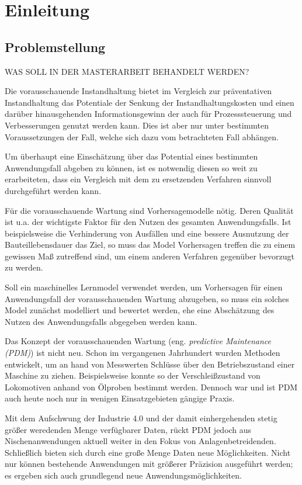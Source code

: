 \chapter{Einleitung}
\label{ch:einleitung}

\section{Problemstellung}
\label{sec:motivation}
WAS SOLL IN DER MASTERARBEIT BEHANDELT WERDEN?

Die vorausschauende Instandhaltung bietet im Vergleich zur präventativen Instandhaltung das Potentiale der Senkung der Instandhaltungskosten und einen darüber hinausgehenden Informationsgewinn der auch für Prozesssteuerung und Verbesserungen genutzt werden kann. Dies ist aber nur unter bestimmten Voraussetzungen der Fall, welche sich dazu vom betrachteten Fall abhängen.

Um überhaupt eine Einschätzung über das Potential eines bestimmten Anwendungsfall abgeben zu können, ist es notwendig diesen so weit zu erarbeiteten, dass ein Vergleich mit dem zu ersetzenden Verfahren sinnvoll durchgeführt werden kann.

Für die vorausschauende Wartung sind Vorhersagemodelle nötig. Deren Qualität ist u.a. der wichtigste Faktor für den Nutzen des gesamten Anwendungsfalls. Ist beispielsweise die Verhinderung von Ausfällen und eine bessere Ausnutzung der Bauteillebensdauer das Ziel, so muss das Model Vorhersagen treffen die zu einem gewissen Maß zutreffend sind, um einem anderen Verfahren gegenüber bevorzugt zu werden.

Soll ein maschinelles Lernmodel verwendet werden, um Vorhersagen für einen Anwendungsfall der vorausschauenden Wartung abzugeben, so muss ein solches Model zunächst modelliert und bewertet werden, ehe eine Abschätzung des Nutzen des Anwendungsfalls abgegeben werden kann.

Das Konzept der vorausschauenden Wartung (eng. \textit{predictive Maintenance (PDM)}) ist nicht neu. Schon im vergangenen Jahrhundert wurden Methoden entwickelt, um an hand von Messwerten Schlüsse über den Betriebszustand einer Maschine zu ziehen. Beispielsweise konnte so der Verschleißzustand von Lokomotiven anhand von Ölproben bestimmt werden.  Dennoch war und ist PDM auch heute noch nur in wenigen Einsatzgebieten gängige Praxis.

Mit dem Aufschwung der Industrie 4.0 und der damit einhergehenden stetig größer weredenden Menge verfügbarer Daten, rückt PDM jedoch aus Nischenanwendungen aktuell weiter in den Fokus von Anlagenbetreidenden. Schließlich bieten sich durch eine große Menge Daten neue Möglichkeiten. Nicht nur können bestehende Anwendungen mit größerer Präzision ausgeführt werden; es ergeben sich auch grundlegend neue Anwendungsmöglichkeiten. 

